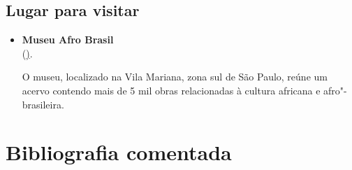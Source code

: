 \documentclass[12pt]{extarticle}
\begin{document}
\subsection{Lugar para visitar}

\begin{itemize}
\item\textbf{Museu Afro Brasil}\\
(\href{http://www.museuafrobrasil.org.br/}).

O museu, localizado na Vila Mariana, zona sul de São Paulo, reúne um
acervo contendo mais de 5 mil obras relacionadas à cultura africana e
afro"-brasileira.
\end{itemize}

\section{Bibliografia comentada}
\end{document}
